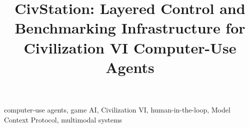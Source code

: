 \documentclass[conference]{IEEEtran}
\begin{document}
\title{CivStation: Layered Control and Benchmarking Infrastructure for Civilization VI Computer-Use Agents}

\author{
}

\maketitle

\begin{IEEEkeywords}
computer-use agents, game AI, Civilization VI, human-in-the-loop, Model Context Protocol, multimodal systems
\end{IEEEkeywords}





\end{document}
